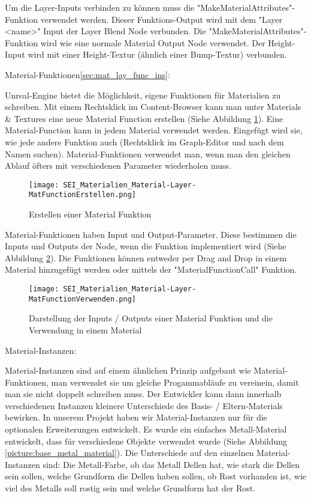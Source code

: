Um die Layer-Inputs verbinden zu können muss die "MakeMaterialAttributes"-Funktion verwendet werden. Dieser
Funktions-Output wird mit dem "Layer <name>" Input der Layer Blend Node verbunden. Die
"MakeMaterialAttributes"-Funktion wird wie eine normale Material Output Node verwendet. Der Height-Input wird mit einer
Height-Textur (ähnlich einer Bump-Textur) verbunden.

Material-Funktionen\ref{sec:mat_lay_func_ins}:

Unreal-Engine bietet die Möglichkeit, eigene Funktionen für Materialien zu schreiben. Mit einem Rechtsklick im
Content-Browser kann man unter Materials & Textures eine neue Material Function erstellen (Siehe
Abbildung \ref{picture:make_mat_func}). Eine Material-Function kann in jedem Material verwendet werden. Eingefügt wird sie, wie jede andere
Funktion auch (Rechtsklick im Graph-Editor und nach dem Namen suchen). Material-Funktionen verwendet man, wenn man
den gleichen Ablauf öfters mit verschiedenen Parameter wiederholen muss.

\begin{figure}[h]
    \centering
    \texttt{[image: SEI\_Materialien\_Material-Layer-MatFunctionErstellen.png]}
    \caption{Erstellen einer Material Funktion}
    \label{picture:make_mat_func}
\end{figure}

Material-Funktionen haben Input und Output-Parameter. Diese bestimmen die Inputs und Outputs der Node, wenn die
Funktion implementiert wird (Siehe Abbildung \ref{picture:use_mat_func}). Die Funktionen können entweder per Drag and
Drop in einem Material hinzugefügt werden oder mittels der "MaterialFunctionCall" Funktion.

\begin{figure}[h]
    \centering
    \texttt{[image: SEI\_Materialien\_Material-Layer-MatFunctionVerwenden.png]}
    \caption{Darstellung der Inputs / Outputs einer Material Funktion und die Verwendung in einem Material}
    \label{picture:use_mat_func}
\end{figure}

Material-Instanzen\citep{ue:mat_instances}:

Material-Instanzen sind auf einem ähnlichen Prinzip aufgebaut wie Material-Funktionen, man verwendet sie um gleiche
Progammabläufe zu vereinein, damit man sie nicht doppelt schreiben muss. Der Entwickler kann dann innerhalb
verschiedenen Instanzen kleinere Unterschiede des Basis- / Eltern-Materials bewirken. In unserem Projekt haben wir
Material-Instanzen nur für die optionalen Erweiterungen entwickelt. Es wurde ein einfaches Metall-Material entwickelt,
dass für verschiedene Objekte verwendet wurde (Siehe Abbildung \ref{picture:base_metal_material}). Die Unterschiede auf
den einzelnen Material-Instanzen sind: Die Metall-Farbe, ob das Metall Dellen hat, wie stark die Dellen sein sollen,
welche Grundform die Dellen haben sollen, ob Rost vorhanden ist, wie viel des Metalls soll rostig sein und welche
Grundform hat der Rost.

